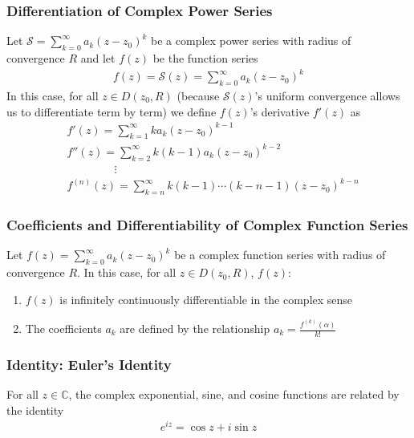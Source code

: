 \documentclass[11pt, a4paper]{article}
\newcommand{\C}{\mathbb{C}} %
\begin{document}
\subsubsection{Differentiation of Complex Power Series}
Let $\displaystyle{\mathcal{S} = \sum_{k = 0}^{\infty} a_{k}(z - z_0)^{k}} $ be a complex power series with radius of convergence $ R $ and let $ f(z) $ be the function series
\begin{align*}
	f(z) = \mathcal{S}(z) = \sum_{k = 0}^{\infty} a_{k}(z - z_0)^{k}
\end{align*}
In this case, for all $ z \in D(z_0, R) $ (because $ \mathcal{S}(z) $'s uniform convergence allows us to differentiate term by term) we define $ f(z) $'s derivative $ f'(z) $ as
\begin{align*}
	&f'(z) = \sum_{k = 1}^{\infty}  k a_k (z - z_0)^{k-1}\\
	&f''(z) = \sum_{k = 2}^{\infty}  k (k-1) a_k (z - z_0)^{k-2}\\
	&\qquad \quad \quad \ \vdots\\
	&f^{(n)}(z) = \sum_{k = n}^{\infty}  k (k-1) \cdots (k - n - 1) (z - z_0)^{k-n}
\end{align*}


\subsubsection{Coefficients and Differentiability of Complex Function Series}
Let $\displaystyle{f(z) = \sum_{k = 0}^{\infty} a_{k}(z - z_0)^{k}} $ be a complex function series with radius of convergence $ R $. In this case, for all $ z \in D(z_0, R) $, $ f(z) $:
\begin{enumerate}
	\item $ f(z) $ is infinitely continuously differentiable in the complex sense
	\item The coefficients $ a_k  $ are defined by the relationship $ \displaystyle{	a_k = \frac{f^{(k)}(\alpha)}{k!}} $
\end{enumerate}

\subsubsection{Identity: Euler's Identity}
For all $ z \in \C $, the complex exponential, sine, and cosine functions are related by the identity
\begin{align*}
	e^{iz} = \cos z + i \sin z
\end{align*}
\end{document}

